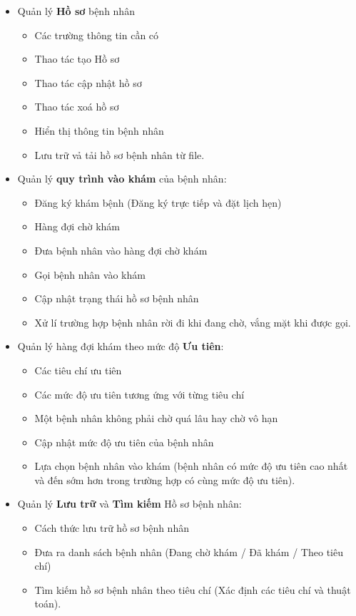\begin{itemize}
    \item Quản lý \textcolor{FamiBlue}{\bf Hồ sơ} bệnh nhân
    \begin{itemize}
        \item Các trường thông tin cần có
        \item Thao tác tạo Hồ sơ
        \item Thao tác cập nhật hồ sơ
        \item Thao tác xoá hồ sơ
        \item Hiển thị thông tin bệnh nhân
        \item Lưu trữ vả tải hồ sơ bệnh nhân từ file.
    \end{itemize}
    \item Quản lý \textcolor{FamiBlue}{\bf quy trình vào khám} của bệnh nhân:
    \begin{itemize}
        \item Đăng ký khám bệnh (Đăng ký trực tiếp và đặt lịch hẹn)
        \item Hàng đợi chờ khám
        \item Đưa bệnh nhân vào hàng đợi chờ khám
        \item Gọi bệnh nhân vào khám
        \item Cập nhật trạng thái hồ sơ bệnh nhân
        \item Xử lí trường hợp bệnh nhân rời đi khi đang chờ, vắng mặt khi được gọi.
    \end{itemize}
    \item Quản lý hàng đợi khám theo mức độ \textcolor{FamiBlue}{\bf Ưu tiên}:
    \begin{itemize}
        \item Các tiêu chí ưu tiên
        \item Các mức độ ưu tiên tương ứng với từng tiêu chí
        \item Một bệnh nhân không phải chờ quá lâu hay chờ vô hạn
        \item Cập nhật mức độ ưu tiên của bệnh nhân
        \item Lựa chọn bệnh nhân vào khám (bệnh nhân có mức độ ưu tiên cao nhất và đến sớm hơn trong trường hợp có cùng mức độ ưu tiên).
    \end{itemize}
    \item Quản lý \textcolor{FamiBlue}{\bf Lưu trữ} và \textcolor{FamiBlue}{\bf Tìm kiếm} Hồ sơ bệnh nhân:
    \begin{itemize}
        \item Cách thức lưu trữ hồ sơ bệnh nhân
        \item Đưa ra danh sách bệnh nhân (Đang chờ khám / Đã khám / Theo tiêu chí)
        \item Tìm kiếm hồ sơ bệnh nhân theo tiêu chí (Xác định các tiêu chí và thuật toán).
    \end{itemize}
\end{itemize}
